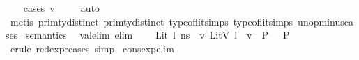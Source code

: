 \begin{isabellebody}
%
\isadelimproof
\ \ %
\endisadelimproof
%
\isatagproof
{}\isamarkupfalse%
\ {\isacharparenleft}{\kern0pt}cases\ v{\isacharparenright}{\kern0pt}\isanewline
\ \ \ \isamarkupfalse%
\ auto{\isacharbrackleft}{\kern0pt}{}{\isacharbrackright}{\kern0pt}\isanewline
\ \ \isamarkupfalse%
\ {\isacharparenleft}{\kern0pt}metis\ prim{\isacharunderscore}{\kern0pt}ty{\isachardot}{\kern0pt}distinct{\isacharparenleft}{\kern0pt}{}{\isacharparenright}{\kern0pt}\ prim{\isacharunderscore}{\kern0pt}ty{\isachardot}{\kern0pt}distinct{\isacharparenleft}{\kern0pt}{}{\isacharparenright}{\kern0pt}\ type{\isacharunderscore}{\kern0pt}of{\isacharunderscore}{\kern0pt}lit{\isachardot}{\kern0pt}simps{\isacharparenleft}{\kern0pt}{}{\isacharparenright}{\kern0pt}\ type{\isacharunderscore}{\kern0pt}of{\isacharunderscore}{\kern0pt}lit{\isachardot}{\kern0pt}simps{\isacharparenleft}{\kern0pt}{}{\isacharparenright}{\kern0pt}\ unop{\isacharunderscore}{\kern0pt}minus{\isachardot}{\kern0pt}cases{\isacharparenright}{\kern0pt}%
\endisatagproof
{\isafoldproof}%
%
\isadelimproof
\isanewline
%
\endisadelimproof
\isanewline
\isanewline
{}\isamarkupfalse%
\ semantics\ \isanewline
\isanewline
{}\isamarkupfalse%
\ val{\isacharunderscore}{\kern0pt}elim\ {\isacharbrackleft}{\kern0pt}elim{\isacharbang}{\kern0pt}{\isacharbrackright}{\kern0pt}{\isacharcolon}{\kern0pt}\isanewline
\ {\isachardoublequoteopen}{\isasymlbrakk}\ {\isasymLambda}{\isacharcomma}{\kern0pt}{\isasymGamma}{\isacharcomma}{\kern0pt}{\isasymDelta}\ {\isasymturnstile}\ {\isasymlangle}Lit\ l{\isacharcomma}{\kern0pt}\ n{\isacharunderscore}{\kern0pt}s{\isasymrangle}\ {\isasymDown}\ v{\isacharprime}{\kern0pt}{\isacharsemicolon}{\kern0pt}\ {\isacharparenleft}{\kern0pt}LitV\ l{\isacharparenright}{\kern0pt}\ {\isacharequal}{\kern0pt}\ v{\isacharprime}{\kern0pt}\ {\isasymLongrightarrow}\ P\ {\isasymrbrakk}\ {\isasymLongrightarrow}\ P{\isachardoublequoteclose}\isanewline
%
\isadelimproof
\ \ %
\endisadelimproof
%
\isatagproof
{}\isamarkupfalse%
\ {\isacharparenleft}{\kern0pt}erule\ red{\isacharunderscore}{\kern0pt}expr{\isachardot}{\kern0pt}cases{\isacharsemicolon}{\kern0pt}\ simp{\isacharparenright}{\kern0pt}%
\endisatagproof
{\isafoldproof}%
%
\isadelimproof
\isanewline
%
\endisadelimproof
\isanewline
{}\isamarkupfalse%
\ cons{\isacharunderscore}{\kern0pt}exp{\isacharunderscore}{\kern0pt}elim\ {\isacharcolon}{\kern0pt}\isanewline

\end{isabellebody}
